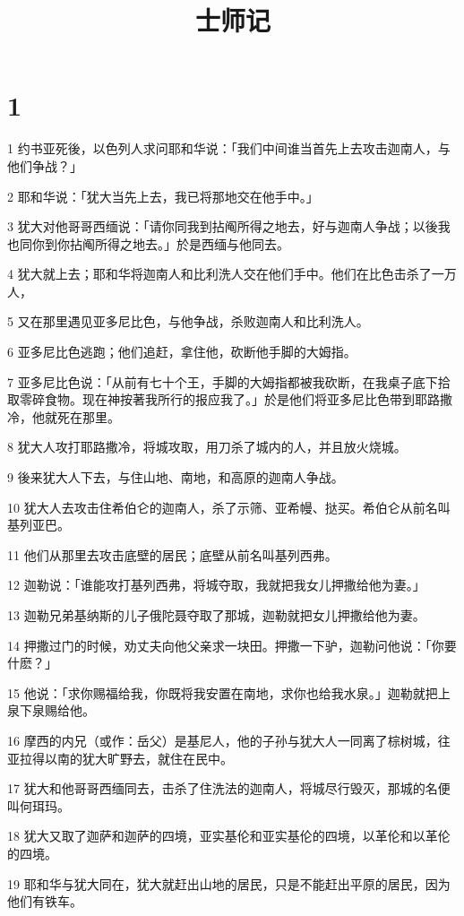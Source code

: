 

\title{士师记}


\chapter{1}

\par 1 约书亚死後，以色列人求问耶和华说：「我们中间谁当首先上去攻击迦南人，与他们争战？」
\par 2 耶和华说：「犹大当先上去，我已将那地交在他手中。」
\par 3 犹大对他哥哥西缅说：「请你同我到拈阄所得之地去，好与迦南人争战；以後我也同你到你拈阄所得之地去。」於是西缅与他同去。
\par 4 犹大就上去；耶和华将迦南人和比利洗人交在他们手中。他们在比色击杀了一万人，
\par 5 又在那里遇见亚多尼比色，与他争战，杀败迦南人和比利洗人。
\par 6 亚多尼比色逃跑；他们追赶，拿住他，砍断他手脚的大姆指。
\par 7 亚多尼比色说：「从前有七十个王，手脚的大姆指都被我砍断，在我桌子底下拾取零碎食物。现在神按著我所行的报应我了。」於是他们将亚多尼比色带到耶路撒冷，他就死在那里。
\par 8 犹大人攻打耶路撒冷，将城攻取，用刀杀了城内的人，并且放火烧城。
\par 9 後来犹大人下去，与住山地、南地，和高原的迦南人争战。
\par 10 犹大人去攻击住希伯仑的迦南人，杀了示筛、亚希幔、挞买。希伯仑从前名叫基列亚巴。
\par 11 他们从那里去攻击底壁的居民；底壁从前名叫基列西弗。
\par 12 迦勒说：「谁能攻打基列西弗，将城夺取，我就把我女儿押撒给他为妻。」
\par 13 迦勒兄弟基纳斯的儿子俄陀聂夺取了那城，迦勒就把女儿押撒给他为妻。
\par 14 押撒过门的时候，劝丈夫向他父亲求一块田。押撒一下驴，迦勒问他说：「你要什麽？」
\par 15 他说：「求你赐福给我，你既将我安置在南地，求你也给我水泉。」迦勒就把上泉下泉赐给他。
\par 16 摩西的内兄（或作：岳父）是基尼人，他的子孙与犹大人一同离了棕树城，往亚拉得以南的犹大旷野去，就住在民中。
\par 17 犹大和他哥哥西缅同去，击杀了住洗法的迦南人，将城尽行毁灭，那城的名便叫何珥玛。
\par 18 犹大又取了迦萨和迦萨的四境，亚实基伦和亚实基伦的四境，以革伦和以革伦的四境。
\par 19 耶和华与犹大同在，犹大就赶出山地的居民，只是不能赶出平原的居民，因为他们有铁车。
